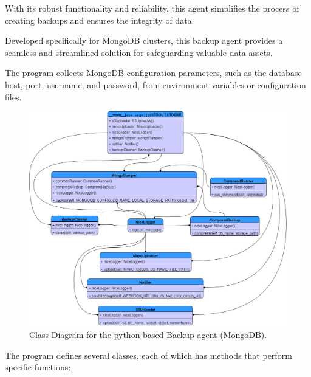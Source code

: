 \hspace{7mm}With its robust functionality and reliability, this agent simplifies the process of creating backups and ensures the integrity of data.

\hspace{7mm}Developed specifically for MongoDB clusters, this backup agent provides a seamless and streamlined solution for safeguarding valuable data assets.

\hspace{7mm}The program collects MongoDB configuration parameters, such as the database host, port, username, and password, from environment variables or configuration files. 

 \begin{figure}[H]\centering
\includegraphics[width=1.0\textwidth,angle=00]{assets/f58.png}
\caption{Class Diagram for the python-based Backup agent (MongoDB).}
\label{fig:f58}
\end{figure}

\hspace{7mm}The program defines several classes, each of which has methods that perform specific functions: 


